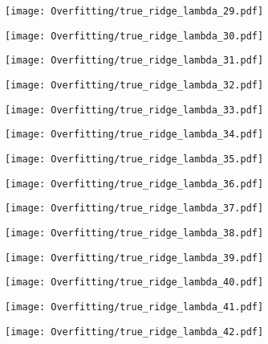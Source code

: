 \documentclass[xcolor=pdftex,dvipsnames,table]{beamer}
\begin{document}
\frame
{
	\begin{center}
		\texttt{[image: Overfitting/true\_ridge\_lambda\_29.pdf]}
	\end{center}
}
\frame
{
	\begin{center}
		\texttt{[image: Overfitting/true\_ridge\_lambda\_30.pdf]}
	\end{center}
}
\frame
{
	\begin{center}
		\texttt{[image: Overfitting/true\_ridge\_lambda\_31.pdf]}
	\end{center}
}
\frame
{
	\begin{center}
		\texttt{[image: Overfitting/true\_ridge\_lambda\_32.pdf]}
	\end{center}
}
\frame
{
	\begin{center}
		\texttt{[image: Overfitting/true\_ridge\_lambda\_33.pdf]}
	\end{center}
}
\frame
{
	\begin{center}
		\texttt{[image: Overfitting/true\_ridge\_lambda\_34.pdf]}
	\end{center}
}
\frame
{
	\begin{center}
		\texttt{[image: Overfitting/true\_ridge\_lambda\_35.pdf]}
	\end{center}
}
\frame
{
	\begin{center}
		\texttt{[image: Overfitting/true\_ridge\_lambda\_36.pdf]}
	\end{center}
}
\frame
{
	\begin{center}
		\texttt{[image: Overfitting/true\_ridge\_lambda\_37.pdf]}
	\end{center}
}
\frame
{
	\begin{center}
		\texttt{[image: Overfitting/true\_ridge\_lambda\_38.pdf]}
	\end{center}
}
\frame
{
	\begin{center}
		\texttt{[image: Overfitting/true\_ridge\_lambda\_39.pdf]}
	\end{center}
}
\frame
{
	\begin{center}
		\texttt{[image: Overfitting/true\_ridge\_lambda\_40.pdf]}
	\end{center}
}
\frame
{
	\begin{center}
		\texttt{[image: Overfitting/true\_ridge\_lambda\_41.pdf]}
	\end{center}
}
\frame
{
	\begin{center}
		\texttt{[image: Overfitting/true\_ridge\_lambda\_42.pdf]}
	\end{center}
}
\end{document}
